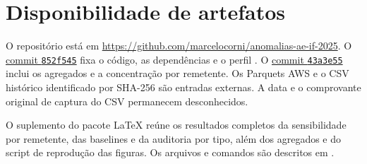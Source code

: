 \section*{Disponibilidade de artefatos}
O repositório está em \url{https://github.com/marcelocorni/anomalias-ae-if-2025}. O \href{https://github.com/marcelocorni/anomalias-ae-if-2025/tree/852f5452d4f59b2e4615914b69ce0b7a19d423ef}{commit \texttt{852f545}} fixa o código, as dependências e o perfil . O \href{https://github.com/marcelocorni/anomalias-ae-if-2025/tree/43a3e55b0fb25c94c529483d3fce559482e4272e/artigo}{commit \texttt{43a3e55}} inclui os agregados e a concentração por remetente. Os Parquets AWS e o CSV histórico identificado por SHA-256 são entradas externas. A data e o comprovante original de captura do CSV permanecem desconhecidos.

O suplemento do pacote LaTeX reúne os resultados completos da sensibilidade por remetente, das baselines e da auditoria por tipo, além dos agregados e do script de reprodução das figuras. Os arquivos e comandos são descritos em .
